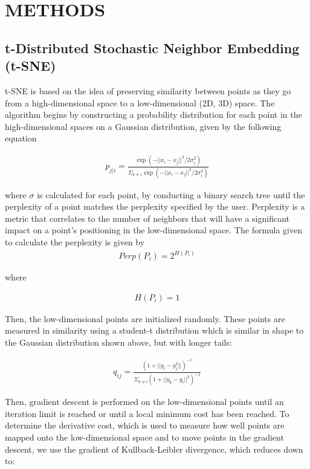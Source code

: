 \documentclass[12pt]{article}
\begin{document}
\section{METHODS}

\subsection{t-Distributed Stochastic Neighbor Embedding (t-SNE)}

t-SNE is based on the idea of preserving similarity between points as they go from a high-dimensional space to a low-dimensional (2D, 3D) space. The algorithm begins by constructing a probability distribution for each point in the high-dimensional spaces on a Gaussian distribution, given by the following equation

\begin{align*}
    p_{j|i} = \frac{\exp(-||x_i-x_j||^2/2\sigma_i^2)}{\Sigma_{k\neq{i}}\exp(-||x_i-x_j||^2/2\sigma_i^2)}
\end{align*}

where $\sigma$ is calculated for each point, by conducting a binary search tree until the perplexity of a point matches the perplexity specified by the user. Perplexity is a metric that correlates to the number of neighbors that will have a significant impact on a point’s positioning in the low-dimensional space. The formula given to calculate the perplexity is given by 
\begin{align*}
    Perp(P_i)=2^{H(P_i)}
\end{align*}
\centerline{where}
\begin{align*}
    H(P_i)=1
\end{align*}

Then, the low-dimensional points are initialized randomly. These points are measured in similarity using a student-t distribution which is similar in shape to the Gaussian distribution shown above, but with longer tails:

\begin{align*}
q_{ij} = \frac{(1+||y_i-y_j^2||)^{-1}}{\Sigma_{k\neq{l}}(1+||y_k-y_l||^2)^{-1}}
\end{align*}



Then, gradient descent is performed on the low-dimensional points until an iteration limit is reached or until a local minimum cost has been reached. To determine the derivative cost, which is used to measure how well points are mapped onto the low-dimensional space and to move points in the gradient descent, we use the gradient of Kullback-Leibler divergence, which reduces down to:
\end{document}
